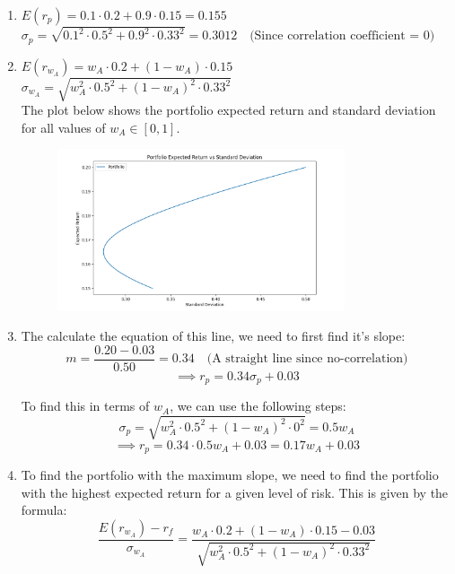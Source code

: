 \documentclass[a4paper]{article}
\begin{document}
\begin{enumerate}[label=(\alph*)]
    \item $E(r_p) = 0.1 \cdot 0.2 + 0.9 \cdot 0.15 = 0.155$ \\

    $\sigma_p = \sqrt{0.1^2 \cdot 0.5^2 + 0.9^2 \cdot 0.33^2} = 0.3012 \quad \text{(Since correlation coefficient = 0)}$

    \vspace{5mm}
    \item $E(r_{w_A}) = w_A \cdot 0.2 + (1 - w_A) \cdot 0.15$ \\
    $\sigma_{w_A} = \sqrt{w_A^2 \cdot 0.5^2 + (1 - w_A)^2 \cdot 0.33^2}$ \\

    The plot below shows the portfolio expected return and standard deviation for all values of $w_A \in [0, 1]$.
    \begin{figure}[h]
        \centering
        \includegraphics[width=0.8\textwidth]{q7.png}
    \end{figure}

    \vspace{5mm}
    \item The calculate the equation of this line, we need to first find it's slope:
    \[
        m = \frac{0.20 - 0.03}{0.50} = 0.34 \quad \text{(A straight line since no-correlation)}
    \]
    \[
        \implies r_p = 0.34 \sigma_p + 0.03
    \]

    To find this in terms of $w_A$, we can use the following steps:
    \[
        \sigma_p = \sqrt{w_A^2 \cdot 0.5^2 + (1 - w_A)^2 \cdot 0^2} = 0.5w_A
    \]
    \[
        \implies r_p = 0.34 \cdot 0.5w_A + 0.03 = 0.17w_A + 0.03
    \]

    \vspace{5mm}
    \item To find the portfolio with the maximum slope, we need to find the portfolio with the highest expected return for a given level of risk. This is given by the formula:
    \[
        \frac{E(r_{w_A}) - r_f}{\sigma_{w_A}} = \frac{w_A \cdot 0.2 + (1 - w_A) \cdot 0.15 - 0.03}{\sqrt{w_A^2 \cdot 0.5^2 + (1 - w_A)^2 \cdot 0.33^2}}
    \]


\end{enumerate}
\end{document}
